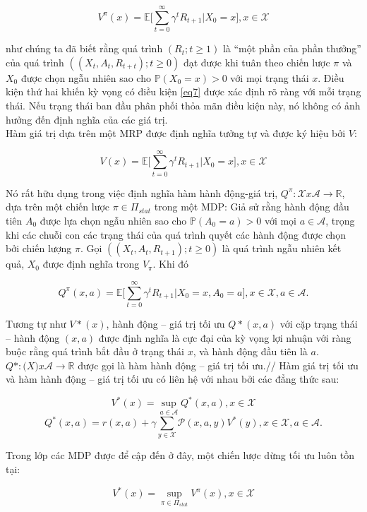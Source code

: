 \documentclass[14pt,a4paper,oneside]{report}		%
\begin{document}
\begin{equation} \label{eq7}
V^\pi(x)=\mathbb{E}\bigg[\displaystyle\sum^\infty_{t=0}{\gamma^tR_{t+1}|X_0=x}\bigg], x\in\mathcal{X}
\end{equation}


như chúng ta đã biết rằng quá trình $(R_t ; t\geq 1)$ là “một phần của phần thưởng” của quá trình $((X_t,A_t,R_{t+t});t\geq 0)$ đạt được khi tuân theo chiến lược $\pi$ và $X_0$ được chọn ngẫu nhiên sao cho $\mathbb{P}(X_0=x)>0$ với mọi trạng thái $x$. Điều kiện thứ hai khiến kỳ vọng có điều kiện \ref{eq7} được xác định rõ ràng với mỗi trạng thái. Nếu trạng thái ban đầu phân phối thỏa mãn điều kiện này, nó không có ảnh hưởng đến định nghĩa của các giá trị.\\
Hàm giá trị dựa trên một MRP được định nghĩa tưởng tự và được ký hiệu bởi $V$:

$$V(x)=\mathbb{E}\bigg[\displaystyle\sum^\infty_{t=0}{\gamma^tR_{t+1}|X_0=x}\bigg], x\in\mathcal{X}$$

Nó rất hữu dụng trong việc định nghĩa hàm hành động-giá trị, $Q^\pi:\mathcal{X}x\mathcal{A}\rightarrow\mathbb{R}$, dựa trên một chiến lược $\pi\in\Pi_{stat}$ trong một MDP: Giả sử rằng hành động đầu tiên $A_0$ được lựa chọn ngẫu nhiên sao cho $\mathbb{P}(A_0=a)>0$ với mọi $a\in\mathcal{A}$, trọng khi các chuỗi con các trạng thái của quá trình quyết các hành động được chọn bởi chiến lượng $\pi$. Gọi $((X_t,A_t,R_{t+1});t\geq0)$ là quá trình ngẫu nhiên kết quả, $X_0$ được định nghĩa trong $V_\pi$. Khi đó

$$Q^\pi(x,a) =\mathbb{E}\bigg[\displaystyle\sum^\infty_{t=0}{\gamma^tR_{t+1}|X_0=x,A_0=a}\bigg], x\in\mathcal{X}, a\in\mathcal{A}.$$

Tương tự như $V*(x)$, hành động – giá trị tối ưu $Q*(x,a)$ với cặp trạng thái – hành động $(x,a)$ được định nghĩa là cực đại của kỳ vọng lợi nhuận với ràng buộc rằng quá trình bắt đầu ở trạng thái $x$, và hành động đầu tiên là $a$. $Q*:\mathcal(X)x\mathcal{A}\rightarrow\mathbb{R}$ được gọi là hàm hành động – giá trị tối ưu.//
Hàm giá trị tối ưu và hàm hành động – giá trị tối ưu có liên hệ với nhau bởi các đẳng thức sau:

$$V^*(x) = \displaystyle\sup_{a\in\mathcal{A}} Q^*(x,a),  x\in\mathcal{X}$$
$$Q^*(x,a) = r(x,a) + \gamma \displaystyle\sum_{y\in\mathcal{X}}{\mathcal{P}(x,a,y)V^*(y)}, x\in\mathcal{X}, a\in\mathcal{A}.$$

Trong lớp các MDP được để cập đến ở đây, một chiến lược dừng tối ưu luôn tồn tại:

$$V^*(x) = \displaystyle\sup_{\pi\in\Pi_{stat}} V^\pi(x),  x\in\mathcal{X}$$
\end{document}
